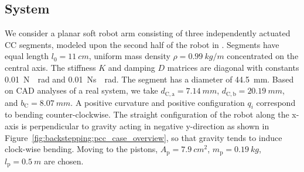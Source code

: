 \subsection{System}
%
We consider a planar soft robot arm consisting of three independently actuated CC segments, modeled upon the second half of the robot in \citep{della2020model}. %
Segments have equal length $l_{0} = \SI{11}{cm}$, uniform mass density $\rho = \SI{0.99}{kg \per m}$ concentrated on the central axis. %
%
The stiffness $K$ and damping $D$ matrices are diagonal with constants \SI{0.01}{N \per rad} and \SI{0.01}{Ns \per rad}. The segment has a diameter of \SI{44.5}{mm}. Based on CAD analyses of a real system, we take $d_{\mathrm{C},\mathrm{a}} = \SI{7.14}{mm}$, $d_{\mathrm{C},\mathrm{b}} = \SI{20.19}{mm}$, and $b_\mathrm{C} = \SI{8.07}{mm}$.
%
A positive curvature and positive configuration $q_i$ correspond to bending counter-clockwise. 
The straight configuration of the robot along the x-axis is perpendicular to gravity acting in negative y-direction as shown in Figure~\ref{fig:backstepping:pcc_case_overview}, so that gravity tends to induce clock-wise bending.
%
Moving to the pistons, $A_\mathrm{p} = \SI{7.9}{cm^2}$, $m_\mathrm{p} = \SI{0.19}{kg}$, $l_\mathrm{p} = \SI{0.5}{m}$ are chosen.
